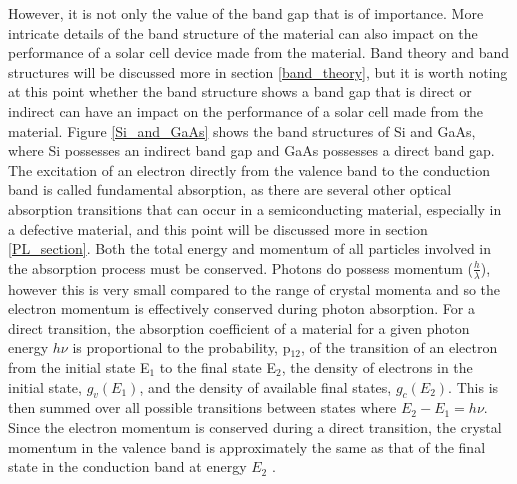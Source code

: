 However, it is not only the value of the band gap that is of importance. More intricate details of the band structure of the material can also impact on the performance of a solar cell device made from the material. Band theory and band structures will be discussed more in section \ref{band_theory}, but it is worth noting at this point whether the band structure shows a band gap that is direct or indirect can have an impact on the performance of a solar cell made from the material. Figure \ref{Si_and_GaAs} shows the band structures of Si and GaAs, where Si possesses an indirect band gap and GaAs possesses a direct band gap. The excitation of an electron directly from the valence band to the conduction band is called fundamental absorption, as there are several other optical absorption transitions that can occur in a semiconducting material, especially in a defective material, and this point will be discussed more in section \ref{PL_section}. Both the total energy and momentum of all particles involved in the absorption process must be conserved. Photons do possess momentum ($\frac{h}{\lambda}$), however this is very small compared to the range of crystal momenta and so the electron momentum is effectively conserved during photon absorption. For a direct transition, the absorption coefficient of a material for a given photon energy $h \nu$ is proportional to the probability, p$_{12}$, of the transition of an electron from the initial state E$_1$ to the final state E$_2$, the density of electrons in the initial state, $g_{v}(E_1)$, and the density of available final states, $g_{c}(E_2)$. This is then summed over all possible transitions between states where $E_2 - E_1 = h\nu$. Since the electron momentum is conserved during a direct transition, the crystal momentum in the valence band is approximately the same as that of the final state in the conduction band at energy $E_2$ \cite{PV_bands_book}.

